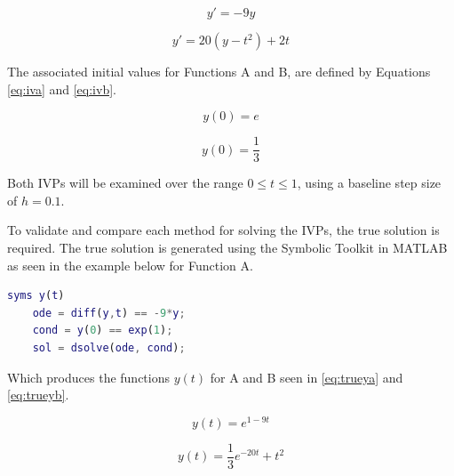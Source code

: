 \documentclass{article}
\begin{document}
\begin{center}
    \centering
    \begin{minipage}{0.5\textwidth}
        \centering
        \begin{equation}
		y' = -9y
		\label{eq:fa}
		\end{equation}
    \end{minipage}\hfill
    \begin{minipage}{0.5\textwidth}
        \centering
        \begin{equation}
        y' = 20 (y-t^2)+2t
		\label{eq:fb}
		\end{equation}
    \end{minipage}
\end{center}


The associated initial values for Functions A and B, are defined by Equations \ref{eq:iva} and \ref{eq:ivb}.


\begin{center}
    \centering
    \begin{minipage}{0.5\textwidth}
        \centering
        \begin{equation}
		y(0) = e
		\label{eq:iva}
		\end{equation}
    \end{minipage}\hfill
    \begin{minipage}{0.5\textwidth}
        \centering
        \begin{equation}
        y(0) = \frac{1}{3}
		\label{eq:ivb}
		\end{equation}
    \end{minipage}
\end{center}


Both IVPs will be examined over the range $ 0 \leq t \leq 1 $, using a baseline step size of $h=0.1$.

To validate and compare each method for solving the IVPs, the true solution is required. The true solution is generated using the Symbolic Toolkit in MATLAB as seen in the example below for Function A.

\bigskip
\begin{lstlisting}[language=Matlab]
	syms y(t)
	ode = diff(y,t) == -9*y;
	cond = y(0) == exp(1);
	sol = dsolve(ode, cond);
\end{lstlisting}
\bigskip

Which produces the functions $y(t)$ for A and B seen in \ref{eq:trueya} and \ref{eq:trueyb}.

\begin{center}
    \centering
    \begin{minipage}{0.5\textwidth}
        \centering
        \begin{equation}
		y(t) = e^{1-9t}
		\label{eq:trueya}
		\end{equation}
    \end{minipage}\hfill
    \begin{minipage}{0.5\textwidth}
        \centering
        \begin{equation}
        y(t) = \frac{1}{3}e^{-20t}+t^2
		\label{eq:trueyb}
		\end{equation}
    \end{minipage}
\end{center}
\end{document}
